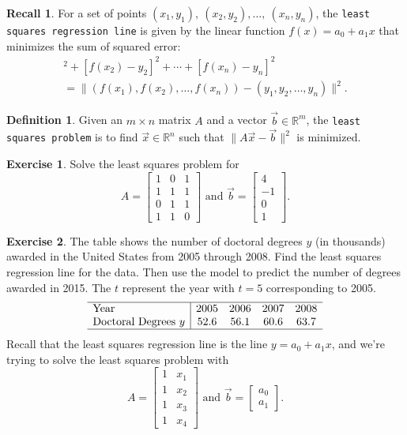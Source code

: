 \documentclass{beamer}
\newcommand{\R}{\mathbb{R}}
\newcommand{\fn}{\insertframenumber}
\theoremstyle{definition}
\newtheorem{exercise}{Exercise}
\newtheorem*{defn}{Definition}
\newtheorem*{recall}{Recall}
\renewcommand{\emph}[1]{{\color{blue}\texttt{#1}}}
\begin{document}
\begin{frame}{\fn}
\begin{recall}
	For a set of points $(x_1,y_1),\ (x_2,y_2),\dots,\ (x_n,y_n)$, the \emph{least squares regression line} is given by the linear function $f(x)=a_0+a_1x$ that minimizes the sum of squared error:
	\begin{multline*}
	[f(x_1)-y_1]^2+[f(x_2)-y_2]^2+\cdots+[f(x_n)-y_n]^2\\=\|(f(x_1),f(x_2),\dots,f(x_n))-(y_1,y_2,\dots,y_n)\|^2.
	\end{multline*}
\end{recall}
\begin{defn}
	Given an $m\times n$ matrix $A$ and a vector $\vec b\in\R^m$, the \emph{least squares problem} is to find $\vec x\in\R^n$ such that $\|A\vec x-\vec b\|^2$ is minimized.
\end{defn}
\end{frame}

\begin{frame}{\fn}
	\begin{exercise}
		Solve the least squares problem for \[A=\begin{bmatrix}1&0&1\\1&1&1\\0&1&1\\1&1&0\end{bmatrix}\text{ and }\vec b=\begin{bmatrix}4\\-1\\0\\1\end{bmatrix}.\]
	\end{exercise}
\end{frame}
\begin{frame}{\fn}
	\begin{exercise}
		The table shows the number of doctoral degrees $y$ (in thousands) awarded in the United States from 2005 through 2008.  Find the least squares regression line for the data.  Then use the model to predict the number of degrees awarded in 2015.  The $t$ represent the year with $t=5$ corresponding to 2005.
		$$\begin{array}{l|cccc}
		\hline
		\text{Year}&2005&2006&2007&2008\\
		\text{Doctoral Degrees }y&52.6&56.1&60.6&63.7\\
		\hline
		\end{array}$$
		Recall that the least squares regression line is the line $y=a_0+a_1 x$, and we're trying to solve the least squares problem with
		\[A=\begin{bmatrix}1&x_1\\1&x_2\\1&x_3\\1&x_4\end{bmatrix}\text{ and }\vec b=\begin{bmatrix}a_0\\a_1\end{bmatrix}.\]
	\end{exercise}
\end{frame}
\end{document}
